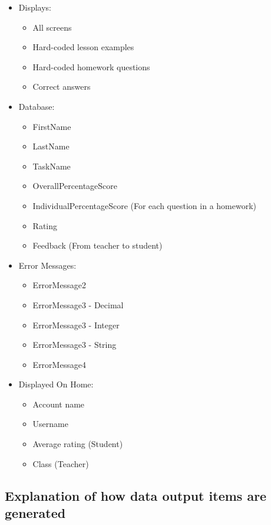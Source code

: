\begin{itemize}
	\item Displays:
	\begin{itemize}
		\item All screens
		\item Hard-coded lesson examples
		\item Hard-coded homework questions
		\item Correct answers
	\end{itemize}
	\item Database:
	\begin{itemize}
		\item FirstName
		\item LastName
		\item TaskName
		\item OverallPercentageScore
		\item IndividualPercentageScore (For each question in a homework)
		\item Rating
		\item Feedback (From teacher to student)
	\end{itemize}
	\item Error Messages:
	\begin{itemize}
		\item ErrorMessage2
		\item ErrorMessage3 - Decimal
		\item ErrorMessage3 - Integer
		\item ErrorMessage3 - String
		\item ErrorMessage4
	\end{itemize}
	\item Displayed On Home:
	\begin{itemize}
		\item Account name
		\item Username
		\item Average rating (Student)
		\item Class (Teacher)
	\end{itemize}
\end{itemize}

\subsection{Explanation of how data output items are generated}

